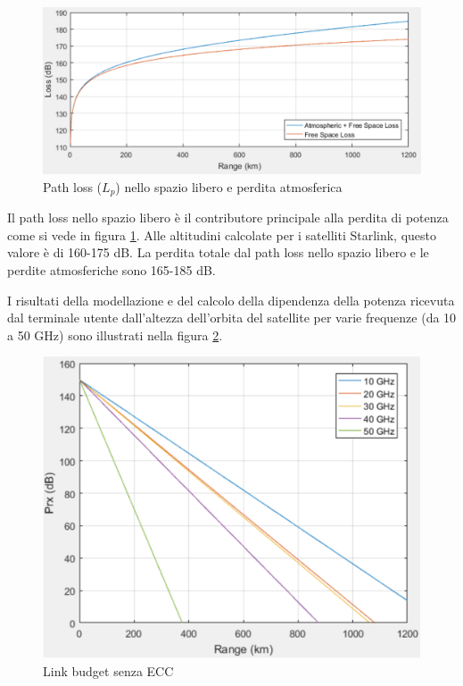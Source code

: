 
\begin{figure}[htbp]
  \centering
  \includegraphics[width=0.8\linewidth]{./res/img/free_space_path_loss_atm_loss.png}
  \caption{Path loss ($L_p$) nello spazio libero e perdita atmosferica}
  \label{fig:free-space-path-loss-atm-loss}
\end{figure}

Il path loss nello spazio libero è il contributore principale alla perdita di potenza come si vede in figura \ref{fig:free-space-path-loss-atm-loss}.
Alle altitudini calcolate per i satelliti Starlink, questo valore è di 160-175 dB.
La perdita totale dal path loss nello spazio libero e le perdite atmosferiche sono 165-185 dB.

I risultati della modellazione e del calcolo della dipendenza della potenza ricevuta dal terminale utente dall'altezza dell'orbita del satellite per varie frequenze (da 10 a 50 GHz) sono illustrati nella figura \ref{fig:link-budget-wo-ecc}.

\begin{figure}[htbp]
  \centering
  \includegraphics[width=0.8\linewidth]{./res/img/link_budget_wo_ecc.png}
  \caption{Link budget senza \ac{ECC}}
  \label{fig:link-budget-wo-ecc}
\end{figure}

